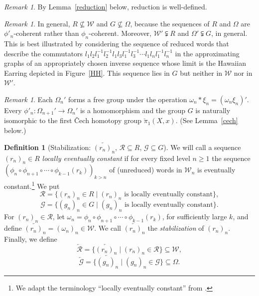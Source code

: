 \documentclass{amsart}
\theoremstyle{definition}
\newtheorem{definition}[theorem]{Definition}
\theoremstyle{remark}
\newtheorem{remark}[theorem]{Remark}
\numberwithin{equation}{section}
\begin{document}
\begin{remark} By Lemma~\ref{reduction} below, reduction is well-defined.
\end{remark}

\begin{remark} In general, $R \nsubseteq {\mathcal W}$ and $G \nsubseteq \Omega$, because the sequences of $R$ and $\Omega$ are $\phi'_n$-coherent rather than $\phi_n$-coherent.
Moreover,  ${\mathcal W}'\subsetneqq R$ and $\Omega'\subsetneqq G$, in general. This is best illustrated by considering the sequence of reduced words that describe the commutators $l_1l_2l_1^{-1}l_2^{-1}l_1l_3l_1^{-1}l_3^{-1}\cdots l_1l_nl_1^{-1}l_n^{-1}$ in the approximating graphs of an appropriately chosen inverse sequence whose limit is the Hawaiian Earring depicted in Figure~\ref{HH}. This sequence lies in $G$ but neither in ${\mathcal W}$ nor in ${\mathcal W}'$.
\end{remark}

\begin{remark}\label{check}
Each $\Omega_n'$ forms a free group under the operation $\omega_n\ast \xi_n=(\omega_n\xi_n)'$.
Every $\phi'_n:\Omega_{n+1}'\rightarrow \Omega_n'$ is a homomorphism and the group $G$ is naturally isomorphic to the first \v{C}ech homotopy group $\check{\pi}_1(X,x)$. (See Lemma~\ref{cech} below.)
\end{remark}

\begin{definition}[Stabilization: $\overleftarrow{(r_n)_n}$, ${\mathcal R}\subseteq R$, ${\mathcal G}\subseteq G$]\label{stab} We will call a sequence  $(r_n)_n\in R$  {\em locally eventually constant} if for every fixed level $n\geqslant 1$ the sequence $(\phi_n\circ \phi_{n+1}\circ \cdots \circ \phi_{k-1}(r_k))_{k>n}$  of (unreduced) words in ${\mathcal W}_n$ is eventually constant.\footnote{We adapt the terminology ``locally eventually constant'' from \cite{MM}.} We put \[{\mathcal R}=\{(r_n)_n\in R\mid (r_n)_n \mbox{ is locally eventually constant}\},\]
\[{\mathcal G}=\{(g_n)_n\in G\mid (g_n)_n \mbox{ is locally eventually constant}\}.\] For $(r_n)_n\in  \mathcal R$, let $\omega_n=\phi_n\circ \phi_{n+1}\circ \cdots \circ \phi_{k-1}(r_k)$, for sufficiently large $k$, and define $\overleftarrow{(r_n)_n}=(\omega_n)_n\in {\mathcal W}$. We call $\overleftarrow{(r_n)_n}$ the  {\em stabilization} of $(r_n)_n$.  Finally, we define \[\overleftarrow{\mathcal R}=\{\overleftarrow{(r_n)_n}\mid (r_n)_n \in {\mathcal R}\}\subseteq {\mathcal W},\]
\[\overleftarrow{\mathcal G}=\{\overleftarrow{(g_n)_n}\mid (g_n)_n\in \mathcal G\}\subseteq \Omega.\]
\end{definition}
\end{document}
